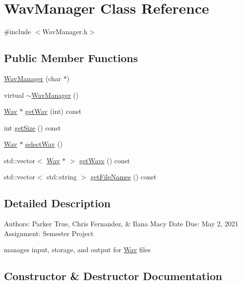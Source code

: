\hypertarget{classWavManager}{}\section{Wav\+Manager Class Reference}
\label{classWavManager}


{\ttfamily \#include $<$Wav\+Manager.\+h$>$}

\subsection*{Public Member Functions}
\begin{DoxyCompactItemize}
\item 
\hyperlink{classWavManager_ae9e3c60a5f1744cf93d8c5a7e81ec279}{Wav\+Manager} (char $\ast$)
\item 
virtual \hyperlink{classWavManager_ada2c41fa0b1f388b3d90ade85fd21f6a}{$\sim$\+Wav\+Manager} ()
\item 
\hyperlink{classWav}{Wav} $\ast$ \hyperlink{classWavManager_a81286b348dd7d7969cfffebc0197e457}{get\+Wav} (int) const
\item 
int \hyperlink{classWavManager_a92aeb164533efeefd7d636b3da5b2828}{get\+Size} () const
\item 
\hyperlink{classWav}{Wav} $\ast$ \hyperlink{classWavManager_a30d87e1568d7fcdcf81089c8125819d1}{select\+Wav} ()
\item 
std\+::vector$<$ \hyperlink{classWav}{Wav} $\ast$ $>$ \hyperlink{classWavManager_af4ca861d89e3aceab92629958223784a}{get\+Wavs} () const
\item 
std\+::vector$<$ std\+::string $>$ \hyperlink{classWavManager_a505c8ecc7ae96bc5c6faad602ac26a6c}{get\+File\+Names} () const
\end{DoxyCompactItemize}


\subsection{Detailed Description}
Authors\+: Parker True, Chris Fernandez, \& Ilana Macy Date Due\+: May 2, 2021 Assignment\+: Semester Project


\begin{DoxyItemize}
\item manages input, storage, and output for \hyperlink{classWav}{Wav} files 
\end{DoxyItemize}

\subsection{Constructor \& Destructor Documentation}
\mbox{\label{classWavManager_ae9e3c60a5f1744cf93d8c5a7e81ec279}} 
